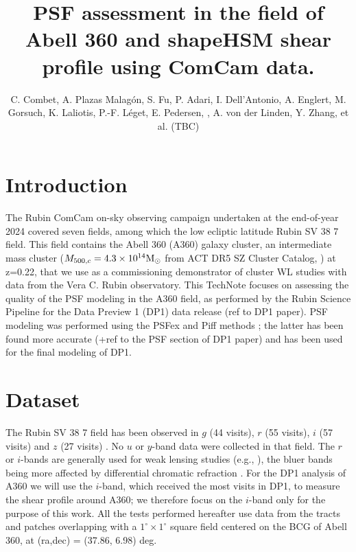 \documentclass[SE,lsstdraft,authoryear,toc]{lsstdoc}
\title{PSF assessment in the field of Abell 360 and shapeHSM shear profile using ComCam data.}
\author{%
C. Combet, A. Plazas Malagón, S. Fu, P. Adari, I. Dell'Antonio, A. Englert, M. Gorsuch, K. Laliotis, P.-F. Léget, E. Pedersen, , A. von der Linden, Y. Zhang, et al. (TBC) 
}
\date{\vcsDate}
\begin{document}
\maketitle


\section{Introduction}
The Rubin ComCam on-sky observing campaign \citep{RTN-095,SITCOMTN-149} 
undertaken at the end-of-year 2024 covered seven fields, among which the low ecliptic latitude Rubin SV 38 7 field. This field contains the Abell 360 (A360) galaxy cluster, an intermediate mass cluster ($M_{500,c} = 4.3\times 10^{14} \rm{M}_\odot$ from ACT DR5 SZ Cluster Catalog, \citealp{2021ApJS..253....3H}) at z=0.22, that we use as a commissioning demonstrator of cluster WL studies with data from the Vera C. Rubin observatory. This TechNote focuses on assessing the quality of the PSF modeling in the A360 field, as performed by the Rubin Science Pipeline for the Data Preview 1 (DP1) data release (ref to DP1 paper). PSF modeling was performed using the PSFex \citep{2011ASPC..442..435B} and Piff methods \citep{2021MNRAS.501.1282J}; the latter has been found more accurate \citep{RTN-095,SITCOMTN-149}(+ref to the PSF section of DP1 paper) and has been used for the final modeling of DP1.

\section{Dataset}
The Rubin SV 38 7 field has been observed in $g$ (44 visits), $r$ (55 visits), $i$ (57 visits) and $z$ (27 visits) \citep{RTN-095,SITCOMTN-149}. No $u$ or $y$-band data were collected in that field. The $r$ or $i$-bands are generally used for weak lensing studies (e.g., \citealp{2018MNRAS.481.3170M}), the bluer bands being more affected by differential chromatic refraction \citep{DMTN-017}. For the DP1 analysis of A360 we will use the $i$-band, which received the most visits in DP1, to measure the shear profile around A360; we therefore focus on the $i$-band only for the purpose of this work. All the tests performed hereafter use data from the tracts and patches overlapping with  a $1^\circ \times 1^\circ$ square field centered on the BCG of Abell 360, at (ra,dec) = (37.86, 6.98) deg. 
\end{document}
